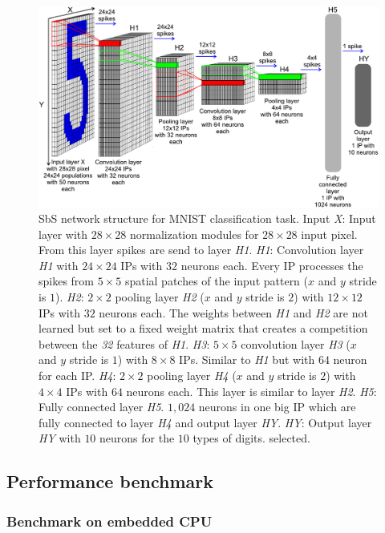 \begin{figure}[!h]
	\includegraphics[width=\columnwidth]{../figures/sbs_network.pdf}
	\caption{SbS network structure for MNIST classification task.
		Input \emph{X}: Input layer with $28\times28$ normalization modules for $28\times28$ input pixel. From this layer spikes are send to layer \emph{H1}. \emph{H1}: Convolution layer \emph{H1} with $24\times24$ IPs with $32$ neurons each. Every IP processes the spikes from $5\times5$ spatial patches of the input pattern ($x$ and $y$ stride is $1$). \emph{H2}: $2\times2$ pooling layer \emph{H2} ($x$ and $y$ stride is $2$) with $12\times12$ IPs with $32$ neurons each. The weights between \emph{H1} and \emph{H2} are not learned but set to a fixed weight matrix that creates a competition between the \emph{32} features of \emph{H1}. \emph{H3}: $5\times5$ convolution layer \emph{H3} ($x$ and $y$ stride is $1$) with $8\times8$ IPs. Similar to \emph{H1} but with $64$ neuron  	for each IP. \emph{H4}: $2\times2$ pooling layer \emph{H4} ($x$ and $y$ stride is $2$) with $4\times4$ IPs with $64$ neurons each. This layer is similar to layer \emph{H2}. \emph{H5}: Fully connected layer \emph{H5}. $1,024$ neurons in one big IP which are fully connected to layer \emph{H4} and output layer \emph{HY}. \emph{HY}: Output layer \emph{HY} with $10$ neurons for the $10$ types of digits. selected.}\label{fig:sbs_network}
\end{figure}



\subsection{Performance benchmark}
\subsubsection{Benchmark on embedded CPU}

